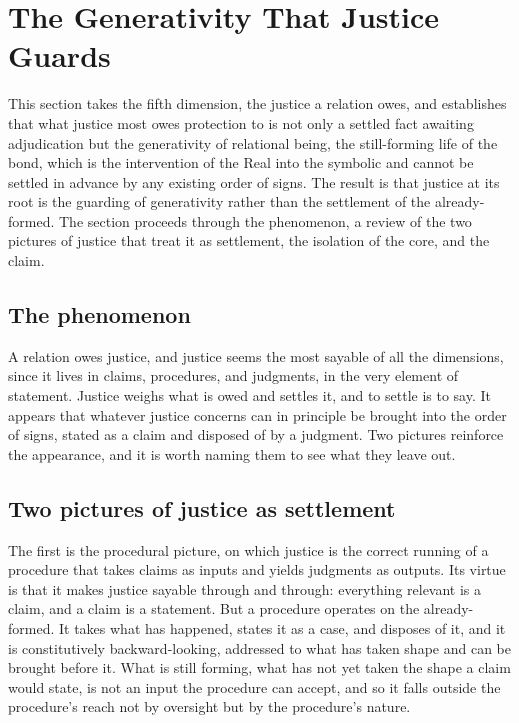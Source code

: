 \section{The Generativity That Justice Guards}
\label{p26:sec:justice}

\noindent
This section takes the fifth dimension, the justice a relation owes, and establishes that what justice most owes protection to is not only a settled fact awaiting adjudication but the generativity of relational being, the still-forming life of the bond, which is the intervention of the Real into the symbolic and cannot be settled in advance by any existing order of signs. The result is that justice at its root is the guarding of generativity rather than the settlement of the already-formed. The section proceeds through the phenomenon, a review of the two pictures of justice that treat it as settlement, the isolation of the core, and the claim.

\subsection*{The phenomenon}

A relation owes justice, and justice seems the most sayable of all the dimensions, since it lives in claims, procedures, and judgments, in the very element of statement. Justice weighs what is owed and settles it, and to settle is to say. It appears that whatever justice concerns can in principle be brought into the order of signs, stated as a claim and disposed of by a judgment. Two pictures reinforce the appearance, and it is worth naming them to see what they leave out.

\subsection*{Two pictures of justice as settlement}

The first is the procedural picture, on which justice is the correct running of a procedure that takes claims as inputs and yields judgments as outputs. Its virtue is that it makes justice sayable through and through: everything relevant is a claim, and a claim is a statement. But a procedure operates on the already-formed. It takes what has happened, states it as a case, and disposes of it, and it is constitutively backward-looking, addressed to what has taken shape and can be brought before it. What is still forming, what has not yet taken the shape a claim would state, is not an input the procedure can accept, and so it falls outside the procedure's reach not by oversight but by the procedure's nature.

